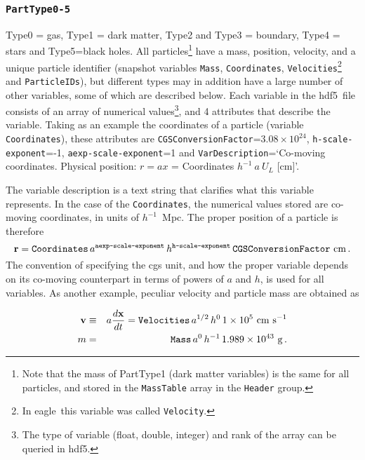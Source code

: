 \documentclass[10pt, a4paper]{article}
\newcommand{\eagle}{{\sc eagle}}
\newcommand{\hdf}{{\sc hdf5}}
\begin{document}
\subsubsection{\texttt{PartType0-5}}
\label{SecParticles}
Type0 = gas, Type1 = dark matter, Type2 and Type3 = boundary, Type4 = stars and
Type5=black holes. All particles\footnote{Note that the mass of PartType1 (dark
matter variables) is the same for all particles, and stored in the
\texttt{MassTable} array in the \texttt{Header} group.} have a mass, position,
velocity, and a unique particle identifier (snapshot variables \texttt{Mass},
\texttt{Coordinates}, \texttt{Velocities}\footnote{In \eagle\ this variable was called \texttt{Velocity}.} and \texttt{ParticleIDs}), but
different types may in addition have a large number of other variables, some of
which are described below. Each variable in the \hdf\ file consists of an array
of numerical values\footnote{The type of variable (float, double, integer) and
rank of the array can be queried in \hdf.}, and 4 attributes that describe the
variable.  Taking as an example the coordinates of a particle (variable
\texttt{Coordinates}), these attributes are
\texttt{CGSConversionFactor}=$3.08\times 10^{24}$,
\texttt{h-scale-exponent}=-1, \texttt{aexp-scale-exponent}=1 and
\texttt{VarDescription}=\lq Co-moving coordinates. Physical position: $r =
ax$ = Coordinates $h^{-1}~a~U_L$ [cm]\rq. 

The variable description is a text string that clarifies what this variable
represents. In the case of the \texttt{Coordinates}, the numerical values
stored are co-moving coordinates, in units of $h^{-1}$~Mpc. The proper position
of a particle is therefore \begin{equation} {\bf r} =
\texttt{Coordinates}\,a^\texttt{aexp-scale-exponent}\,h^\texttt{h-scale-exponent}\,\texttt{CGSConversionFactor}~{\rm
cm}\,.  \label{EqCoords} \end{equation} The convention of specifying the
cgs unit, and how the proper variable depends on its co-moving counterpart in
terms of powers of $a$ and $h$, is used for all variables. As another example,
peculiar velocity and particle mass are obtained as

\begin{eqnarray}
{\bf v}&\equiv& a{d{\bf x}\over dt} = \texttt{Velocities}\,a^{1/2}\,h^0\,1\times 10^5~{\rm cm~s}^{-1}\nonumber\\
m &=& \texttt{Mass}\,a^0\,h^{-1}\,1.989\times 10^{43}~{\rm g}\,.	
\end{eqnarray}
\end{document}
